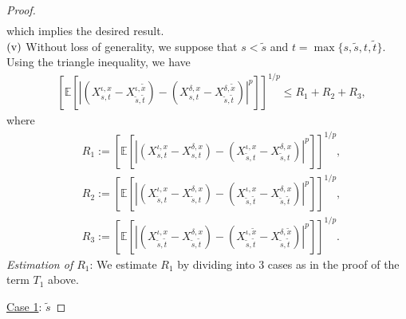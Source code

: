 \documentclass[11pt]{article}
\theoremstyle{theorem}
\theoremstyle{definition}
\newcommand{\bR}{\mathbb{R}}
\newcommand{\1}{{\bf 1}}
\begin{document}
\begin{proof}
\begin{align*}
\end{align*}
which implies the desired result.\\
 $\textup{(v)}$ Without loss of generality, we suppose that $s<\tilde{s}$ and $t = \max\{s, \tilde{s}, t, \tilde{t}\}$.
Using the triangle inequality, we have 
\begin{align}
&\left[\mathbb{E}\left[\left|\left(X^{\iota, x}_{s,t}-X^{\iota,\widetilde{x}}_{\widetilde{s},\widetilde{t}}\right) - \left(X^{\delta, x}_{s,t}-X^{\delta, \widetilde{x}}_{\widetilde{s},\widetilde{t}}\right)\right|^p\right]\right]^{1/p}\leq  R_1+R_2+R_3,
\label{R123}
\end{align}
where
\begin{align*}
&R_1:= \left[\mathbb{E}\left[\left| \left(X^{\iota, x}_{s,t}-X^{\delta, x}_{s,t}\right) - \left(X^{\iota, x}_{\widetilde{s},t}-X^{\delta, x}_{\widetilde{s},t}\right) \right| ^p\right]\right]^{1/p},\\
&R_2:= \left[\mathbb{E}\left[\left| \left(X^{\iota, x}_{\widetilde{s},t}-X^{\delta, x}_{\widetilde{s},t}\right)- \left(X^{\iota, x}_{\widetilde{s},\widetilde{t}}-X^{\delta, x}_{\widetilde{s},\widetilde{t}}\right) \right| ^p\right]\right]^{1/p},\\
&R_3:= \left[\mathbb{E}\left[\left| \left(X^{\iota, x}_{\widetilde{s},\widetilde{t}}-X^{\delta, x}_{\widetilde{s},\widetilde{t}}\right) - \left(X^{\iota, \widetilde{x}}_{\widetilde{s},\widetilde{t}}-X^{\delta, \widetilde{x}}_{\widetilde{s},\widetilde{t}}\right) \right| ^p\right]\right]^{1/p}.
\end{align*}
{\it Estimation of  $R_1$}:
We estimate $R_1$ by dividing into 3 cases as in the proof of the term $T_1$ above.

\noindent\underline{Case 1}: $\widetilde{s}$ 


\end{proof}
\end{document}
